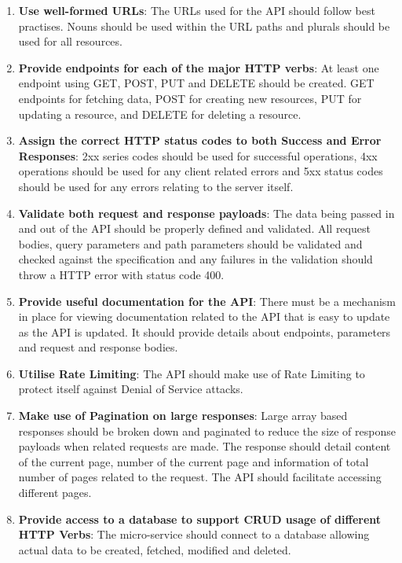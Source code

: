 \begin{enumerate}
    \item \textbf{Use well-formed URLs}: The URLs used for the API should follow best practises. Nouns should be used within the URL paths and plurals should be used for all resources. 
    \item \textbf{Provide endpoints for each of the major HTTP verbs}: At least one endpoint using GET, POST, PUT and DELETE should be created. GET endpoints for fetching data, POST for creating new resources, PUT for updating a resource, and DELETE for deleting a resource. 
    \item \textbf{Assign the correct HTTP status codes to both Success and Error Responses}: 2xx series codes should be used for successful operations, 4xx operations should be used for any client related errors and 5xx status codes should be used for any errors relating to the server itself.
    \item \textbf{Validate both request and response payloads}: The data being passed in and out of the API should be properly defined and validated. All request bodies, query parameters and path parameters should be validated and checked against the specification and any failures in the validation should throw a HTTP error with status code 400.
    \item \textbf{Provide useful documentation for the API}: There must be a mechanism in place for viewing documentation related to the API that is easy to update as the API is updated. It should provide details about endpoints, parameters and request and response bodies. 
    \item \textbf{Utilise Rate Limiting}: The API should make use of Rate Limiting to protect itself against Denial of Service attacks.
    \item \textbf{Make use of Pagination on large responses}: Large array based responses should be broken down and paginated to reduce the size of response payloads when related requests are made. The response should detail content of the current page, number of the current page and information of total number of pages related to the request. The API should facilitate accessing different pages.
    \item \textbf{Provide access to a database to support CRUD usage of different HTTP Verbs}:  The micro-service should connect to a database allowing actual data to be created, fetched, modified and deleted.
\end{enumerate}

